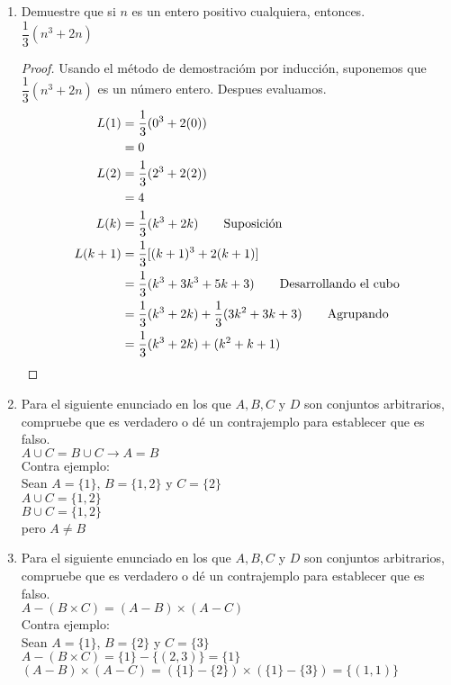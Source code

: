 \documentclass[a4paper,10pt]{article}
\begin{document}
\begin{enumerate}
\item Demuestre que si $n$ es un entero positivo cualquiera, entonces.
\\$\dfrac{1}{3}(n^3 + 2n)$
\begin{proof}
 Usando el método de demostracióm por inducción, suponemos que $\dfrac{1}{3}(n^3 + 2n)$ es un número entero. Despues evaluamos.
 \begin{align*}
 L(1) &= \dfrac{1}{3}(0^3 + 2(0))
 \\&= 0
 \\L(2)&=\dfrac{1}{3}(2^3 + 2(2))
 \\&=4
 \\L(k)&=\dfrac{1}{3}(k^3 + 2k) \tag*{Suposición}
 \\L(k+1)&=\dfrac{1}{3}[(k+1)^3 + 2(k+1)]
 \\&=\dfrac{1}{3}(k^3+3k^3+5k+3) \tag*{Desarrollando el cubo}
 \\&=\dfrac{1}{3}(k^3+2k) + \dfrac{1}{3}(3k^2+3k+3) \tag*{Agrupando}
 \\&=\dfrac{1}{3}(k^3+2k) + (k^2+k+1) \qedhere
 \end{align*}
\end{proof}

\item Para el siguiente enunciado en los que $A,B,C$ y $D$ son conjuntos arbitrarios, compruebe que es verdadero o dé un contrajemplo para establecer que es falso.
\\$A\cup C=B\cup C\to A=B$
\\Contra ejemplo:
\\ Sean $A=\{1\}$, $B=\{1,2\}$ y $C=\{2\}$
\\ $A\cup C=\{1,2\}$
\\ $B\cup C=\{1,2\}$
\\pero $A\neq B$

\item Para el siguiente enunciado en los que $A,B,C$ y $D$ son conjuntos arbitrarios, compruebe que es verdadero o dé un contrajemplo para establecer que es falso.
\\$A-(B\times C)=(A-B)\times(A-C)$
\\Contra ejemplo:
\\Sean $A=\{1\}$, $B=\{2\}$ y $C=\{3\}$
\\ $A-(B\times C) = \{1\} - \{(2,3)\} = \{1\}$
\\$(A-B)\times (A-C)=(\{1\}-\{2\})\times(\{1\}-\{3\})=\{(1,1)\}$

\end{enumerate}
\end{document}
